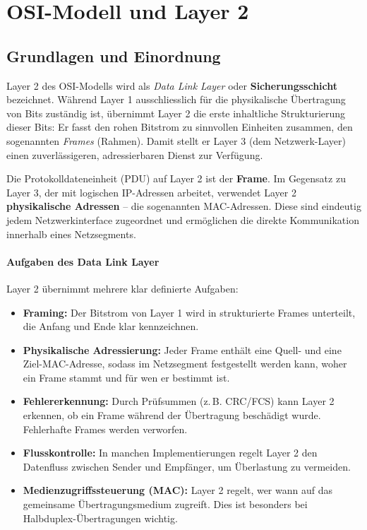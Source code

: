 \documentclass[11pt, oneside, numbers=nönddot]{scrbook}
\begin{document}

\cleardoublepage
{}
\tableofcontents
\clearpage
{}

\chapter{OSI-Modell und Layer 2}
\section{Grundlagen und Einordnung}
Layer 2 des OSI-Modells wird als \textit{Data Link Layer} oder \textbf{Sicherungsschicht} bezeichnet. Während Layer 1 ausschliesslich für die physikalische Übertragung von Bits zuständig ist, übernimmt Layer 2 die erste inhaltliche Strukturierung dieser Bits: Er fasst den rohen Bitstrom zu sinnvollen Einheiten zusammen, den sogenannten \textit{Frames} (Rahmen). Damit stellt er Layer 3 (dem Netzwerk-Layer) einen zuverlässigeren, adressierbaren Dienst zur Verfügung.

Die Protokolldateneinheit (PDU) auf Layer 2 ist der \textbf{Frame}. Im Gegensatz zu Layer 3, der mit logischen IP-Adressen arbeitet, verwendet Layer 2 \textbf{physikalische Adressen} -- die sogenannten MAC-Adressen. Diese sind eindeutig jedem Netzwerkinterface zugeordnet und ermöglichen die direkte Kommunikation innerhalb eines Netzsegments.

\subsubsection*{Aufgaben des Data Link Layer}
Layer 2 übernimmt mehrere klar definierte Aufgaben:
\begin{itemize}
\item \textbf{Framing:} Der Bitstrom von Layer 1 wird in strukturierte Frames unterteilt, die Anfang und Ende klar kennzeichnen.
\item \textbf{Physikalische Adressierung:} Jeder Frame enthält eine Quell- und eine Ziel-MAC-Adresse, sodass im Netzsegment festgestellt werden kann, woher ein Frame stammt und für wen er bestimmt ist.
\item \textbf{Fehlererkennung:} Durch Prüfsummen (z.\,B. CRC/FCS) kann Layer 2 erkennen, ob ein Frame während der Übertragung beschädigt wurde. Fehlerhafte Frames werden verworfen.
\item \textbf{Flusskontrolle:} In manchen Implementierungen regelt Layer 2 den Datenfluss zwischen Sender und Empfänger, um Überlastung zu vermeiden.
\item \textbf{Medienzugriffssteuerung (MAC):} Layer 2 regelt, wer wann auf das gemeinsame Übertragungsmedium zugreift. Dies ist besonders bei Halbduplex-Übertragungen wichtig.
\end{itemize}
\end{document}
